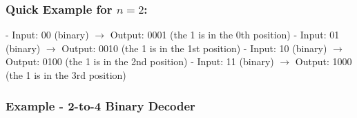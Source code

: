 \documentclass[12pt,openany]{book}
\begin{document}
\subsubsection*{\textbf{Quick Example for $n = 2$}:}
\vspace*{-10px}
\begin{justify}
- Input: 00 (binary) $\rightarrow$ Output: 0001 (the 1 is in the 0th position)\newline
- Input: 01 (binary) $\rightarrow$ Output: 0010 (the 1 is in the 1st position)\newline
- Input: 10 (binary) $\rightarrow$ Output: 0100 (the 1 is in the 2nd position)\newline
- Input: 11 (binary) $\rightarrow$ Output: 1000 (the 1 is in the 3rd position)
\end{justify}

\subsubsection{Example - 2-to-4 Binary Decoder}
\end{document}

